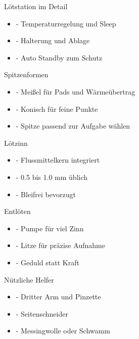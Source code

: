 \begin{frame}{Lötstation im Detail}
\begin{itemize}\setlength{\itemsep}{3mm}
    \item - Temperaturregelung und Sleep
    \item - Halterung und Ablage
    \item - Auto Standby zum Schutz
\end{itemize}
\end{frame}

\begin{frame}{Spitzenformen}
\begin{itemize}\setlength{\itemsep}{3mm}
    \item - Meißel für Pads und Wärmeübertrag
    \item - Konisch für feine Punkte
    \item - Spitze passend zur Aufgabe wählen
\end{itemize}
\end{frame}

\begin{frame}{Lötzinn}
\begin{itemize}\setlength{\itemsep}{3mm}
    \item - Flussmittelkern integriert
    \item - 0.5 bis 1.0 mm üblich
    \item - Bleifrei bevorzugt
\end{itemize}
\end{frame}

\begin{frame}{Entlöten}
\begin{itemize}\setlength{\itemsep}{3mm}
    \item - Pumpe für viel Zinn
    \item - Litze für präzise Aufnahme
    \item - Geduld statt Kraft
\end{itemize}
\end{frame}

\begin{frame}{Nützliche Helfer}
\begin{itemize}\setlength{\itemsep}{3mm}
    \item - Dritter Arm und Pinzette
    \item - Seitenschneider
    \item - Messingwolle oder Schwamm
\end{itemize}
\end{frame}

